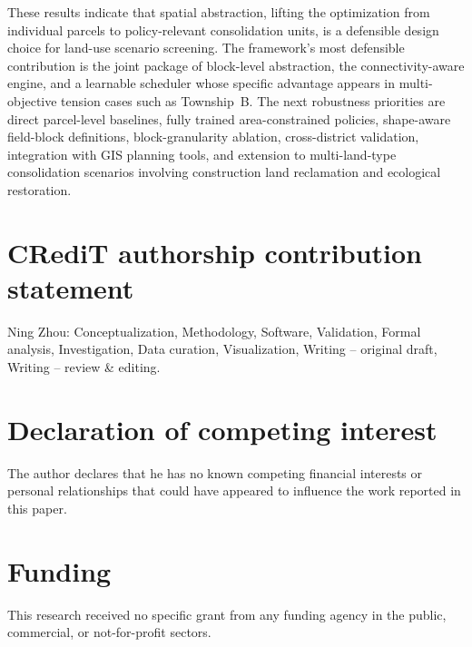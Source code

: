 \documentclass[preprint,12pt]{elsarticle}
\begin{document}
These results indicate that spatial abstraction, lifting the optimization from individual parcels to policy-relevant consolidation units, is a defensible design choice for land-use scenario screening. The framework's most defensible contribution is the joint package of block-level abstraction, the connectivity-aware engine, and a learnable scheduler whose specific advantage appears in multi-objective tension cases such as Township~B. The next robustness priorities are direct parcel-level baselines, fully trained area-constrained policies, shape-aware field-block definitions, block-granularity ablation, cross-district validation, integration with GIS planning tools, and extension to multi-land-type consolidation scenarios involving construction land reclamation and ecological restoration.



\section*{CRediT authorship contribution statement}
Ning Zhou: Conceptualization, Methodology, Software, Validation, Formal analysis, Investigation, Data curation, Visualization, Writing -- original draft, Writing -- review \& editing.

\section*{Declaration of competing interest}
The author declares that he has no known competing financial interests or personal relationships that could have appeared to influence the work reported in this paper.

\section*{Funding}
This research received no specific grant from any funding agency in the public, commercial, or not-for-profit sectors.
\end{document}
